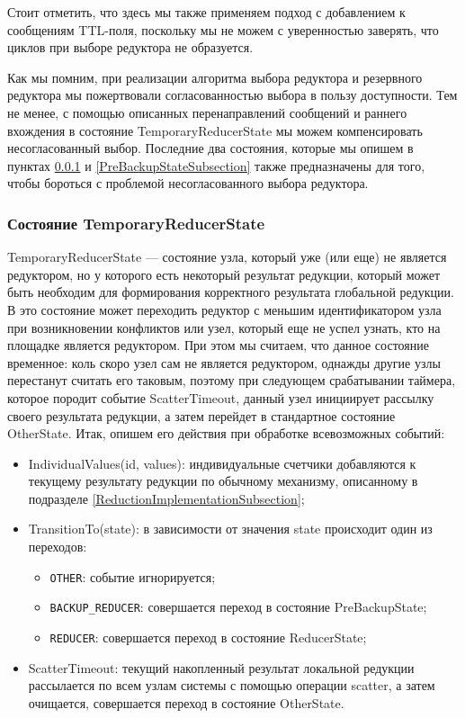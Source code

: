 \documentclass{article}
\theoremstyle{plain}
\theoremstyle{plain}
\theoremstyle{plain}
\theoremstyle{plain}
\theoremstyle{definition}
\theoremstyle{remark}
\theoremstyle{plain}
\begin{document}
Стоит отметить, что здесь мы также применяем подход с добавлением к сообщениям TTL-поля, поскольку мы не можем с уверенностью заверять, что циклов при выборе редуктора не образуется.

Как мы помним, при реализации алгоритма выбора редуктора и резервного редуктора мы пожертвовали согласованностью выбора в пользу доступности. Тем не менее, с помощью описанных перенаправлений сообщений и раннего вхождения в состояние TemporaryReducerState мы можем компенсировать несогласованный выбор. Последние два состояния, которые мы опишем в пунктах \ref{TemporaryReducerStateSubsection} и \ref{PreBackupStateSubsection} также предназначены для того, чтобы бороться с проблемой несогласованного выбора редуктора.

\subsubsection{Состояние TemporaryReducerState}
\label{TemporaryReducerStateSubsection}

TemporaryReducerState --- состояние узла, который уже (или еще) не является редуктором, но у которого есть некоторый результат редукции, который может быть необходим для формирования корректного результата глобальной редукции. В это состояние может переходить редуктор с меньшим идентификатором узла при возникновении конфликтов или узел, который еще не успел узнать, кто на площадке является редуктором. При этом мы считаем, что данное состояние временное: коль скоро узел сам не является редуктором, однажды другие узлы перестанут считать его таковым, поэтому при следующем срабатывании таймера, которое породит событие ScatterTimeout, данный узел инициирует рассылку своего результата редукции, а затем перейдет в стандартное состояние OtherState. Итак, опишем его действия при обработке всевозможных событий:

\begin{itemize}
    \item IndividualValues(id, values): индивидуальные счетчики добавляются к текущему результату редукции по обычному механизму, описанному в подразделе \ref{ReductionImplementationSubsection};
    
    \item TransitionTo(state): в зависимости от значения state происходит один из переходов:
        
        \begin{itemize}
            \item \texttt{OTHER}: событие игнорируется;
            \item \texttt{BACKUP\_REDUCER}: совершается переход в состояние PreBackupState;
            \item \texttt{REDUCER}: совершается переход в состояние ReducerState;
        \end{itemize}
        
    \item ScatterTimeout: текущий накопленный результат локальной редукции рассылается по всем узлам системы с помощью операции scatter, а затем очищается, совершается переход в состояние OtherState.
\end{itemize}
\end{document}
